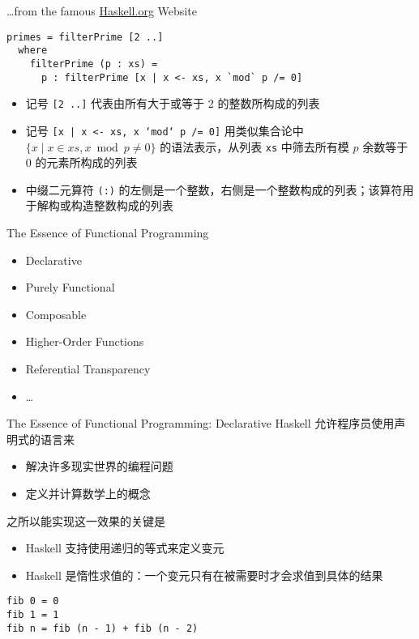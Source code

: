 \documentclass{beamer}
\begin{document}
\begin{frame}[fragile]{\ldots from the famous \url{Haskell.org} Website}
\begin{verbatim}
primes = filterPrime [2 ..]
  where
    filterPrime (p : xs) =
      p : filterPrime [x | x <- xs, x `mod` p /= 0]
\end{verbatim}

\begin{itemize}
\item 记号 {\tt [2 ..]} 代表由所有大于或等于 2 的整数所构成的列表
\pause\item 记号 {\tt [x | x <- xs, x `mod` p /= 0]} 用类似集合论中 $\{x \mid x \in xs, x\bmod p \neq 0\}$ 的语法表示，从列表 {\tt xs} 中筛去所有模 $p$ 余数等于 0 的元素所构成的列表
\pause\item 中缀二元算符 {\tt (:)} 的左侧是一个整数，右侧是一个整数构成的列表；该算符用于解构或构造整数构成的列表
\end{itemize}

\end{frame}

\begin{frame}{The Essence of Functional Programming}
\begin{itemize}
    \item Declarative
    \item Purely Functional
    \item Composable
    \item Higher-Order Functions
    \item Referential Transparency
    \item \ldots
\end{itemize}
\end{frame}

\begin{frame}[fragile]{The Essence of Functional Programming: Declarative}
Haskell 允许程序员使用声明式的语言来
\begin{itemize}
    \item 解决许多现实世界的编程问题
    \item 定义并计算数学上的概念
\end{itemize}

之所以能实现这一效果的关键是
\begin{itemize}
    \item Haskell 支持使用递归的等式\footnotemark 来定义变元
    \item Haskell 是惰性求值的：一个变元只有在被需要时才会求值到具体的结果
\end{itemize}
\begin{verbatim}
fib 0 = 0
fib 1 = 1
fib n = fib (n - 1) + fib (n - 2)
\end{verbatim}

\end{frame}
\end{document}
